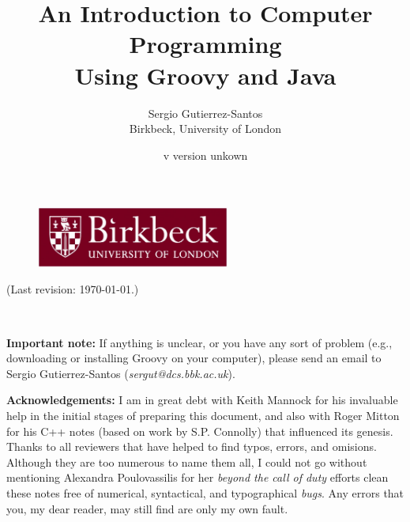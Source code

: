 \documentclass[11pt,a4paper]{book}
\title{An Introduction to Computer Programming\\
  Using Groovy and Java} %
\author{Sergio Gutierrez-Santos\\
  Birkbeck, University of London}
\date{\InputIfFileExists{version.txt}
     {v}
     {version unkown}} %
\begin{document}

\maketitle

\thispagestyle{empty}

\vfill 

\begin{figure}[h!]  %
  \centering
  \includegraphics[height=2cm]{bbk.eps}
\end{figure}

\vfill

\noindent (Last revision: \today.)


\newpage

~\vspace{8cm}

\textbf{Important note: } If anything is unclear, or you have any 
sort of problem (e.g.,
downloading or installing Groovy on your computer), please send an
email to Sergio Gutierrez-Santos (\emph{sergut@dcs.bbk.ac.uk}).

\textbf{Acknowledgements: } I am in great debt with 
Keith Mannock for his invaluable help in the initial stages of
preparing this document, and also with Roger Mitton for his C++ notes
(based on work by S.P. Connolly) that influenced its genesis. 
Thanks to all reviewers that have helped to 
find typos, errors, and omisions. Although they are too numerous to
name them all, I could not go without mentioning Alexandra
Poulovassilis for her \emph{beyond the call of duty} efforts clean
these notes free of numerical, syntactical, and typographical
\emph{bugs}. Any errors that you, my dear reader, may still find are
only my own fault. 

\newpage

\tableofcontents



\end{document}
